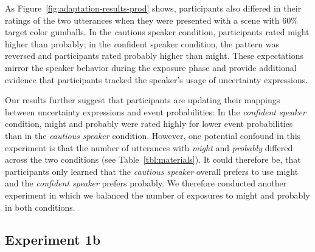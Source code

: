 \documentclass[lucida,biblatex]{sp} %
\begin{document}
As Figure~\ref{fig:adaptation-results-prod} shows, participants also differed in their ratings of the two utterances when they were presented with a scene with 60\% target color gumballs. In the {\emph cautious speaker} condition, participants rated {\sc might} higher than {\sc probably}; in the {\emph confident speaker} condition, the pattern was reversed and participants rated {\sc probably} higher than {\sc might}. These expectations mirror the speaker behavior during the exposure phase and provide additional evidence that participants tracked the speaker's usage of uncertainty expressions. 


Our results further suggest that participants are updating their mappings between uncertainty expressions and event probabilities: In the {\it confident speaker} condition, {\sc might} and {\sc probably} were rated highly for lower event probabilities than in the {\it cautious speaker} condition. However, one potential confound in this experiment is that the number of utterances with \textit{might} and \textit{probably} differed across the two conditions (see Table~\ref{tbl:materials}). It could therefore be, that participants only learned that the {\it cautious speaker} overall prefers to use {\sc might} and the {\it confident speaker} prefers {\sc probably}. We therefore conducted another experiment in which we balanced the number of exposures to {\sc might} and {\sc probably} in both conditions.

\subsection{Experiment 1b}
\end{document}

